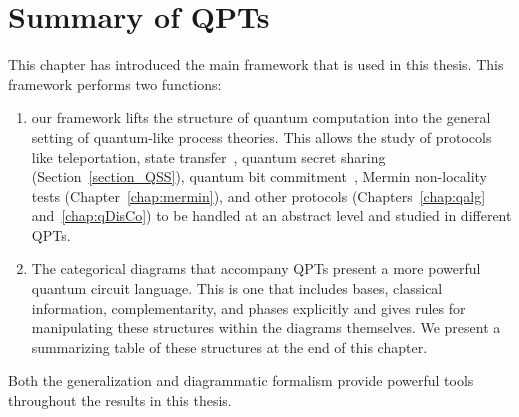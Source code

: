 \section{Summary of QPTs}

This chapter has introduced the main framework that is used in this thesis. This framework performs two functions:
\begin{enumerate}
\item our framework lifts the structure of quantum computation into the general setting of quantum-like process theories. This allows the study of protocols like teleportation, state transfer~\cite{cqm-notes}, quantum secret sharing (Section~\ref{section_QSS}), quantum bit commitment~\cite{katriel-commitment}, Mermin non-locality tests (Chapter~\ref{chap:mermin}), and other protocols (Chapters~\ref{chap:qalg} and~\ref{chap:qDisCo}) to be handled at an abstract level and studied in different QPTs.
\item The categorical diagrams that accompany QPTs present a more powerful quantum circuit language. This is one that includes bases, classical information, complementarity, and phases explicitly and gives rules for manipulating these structures within the diagrams themselves. We present a summarizing table of these structures at the end of this chapter.
\end{enumerate}
Both the generalization and diagrammatic formalism provide powerful tools throughout the results in this thesis.


